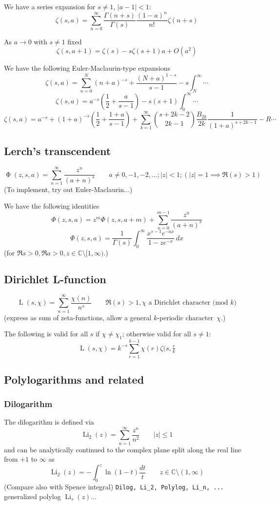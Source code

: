 \documentclass[10pt,dvipdfmx,letterpaper,twoside]{article}
\let\O=\operatorname
\newcommand{\CC}{{\mathbb{C}}}
\let\Gam=\Gamma
\begin{document}
We have a series expansion for $s\neq1$, $|a-1|<1$:
\[ \zeta(s,a) = \sum_{n=0}^\infty \frac{\Gam(n+s)}{\Gam(s)} \frac{(1-a)^n}{n!}\zeta(n+s) \]

As $a\to0$ with $s\neq1$ fixed
\[ \zeta(s,a+1) = \zeta(s) - s \zeta(s+1)a + O(a^2) \]

We have the following Euler-Maclaurin-type expansions
\[ \zeta(s,a) = \sum_{n=0}^N(n+a)^{-s} + \frac{(N+a)^{1-s}}{s-1} - s\int_N^\infty \cdots \]
\[ \zeta(s,a) = a^{-s}(\frac12 + \frac{a}{s-1}) - s(s+1)\int_0^\infty \cdots \]
\[ \zeta(s,a) = a^{-s} + (1+a)^{-s}(\frac12 + \frac{1+a}{s-1}) + \sum_{k=1}^\infty\binom{s+2k-2}{2k-1}\frac{B_{2k}}{2k} \frac{1}{(1+a)^{s+2k-1}} - R\cdots \]

\subsection{Lerch's transcendent}
\[ \O{\Phi}(z,s,a) = \sum_{n=1}^\infty \frac{z^n}{(a+n)^s} \qquad a\neq0,-1,-2,\dots; |z|<1; (|z|=1 \implies \Re(s)>1) \]
(To implement, try out Euler-Maclaurin...)

We have the following identities
\[ \Phi(z,s,a) = z^m \Phi(z,s,a+m) + \sum_{n=0}^{m-1}\frac{z^n}{(a+n)^s} \]
\[ \Phi(z,s,a) = \frac{1}{\Gam(s)}\int_0^\infty \frac{x^{s-1} e^{-ax}}{1-z e^{-x}}\,dx \]
(for $\Re s>0, \Re a>0, z\in\CC\setminus[1,\infty)$.)

\subsection{Dirichlet L-function}
\[ \O{L}(s,\chi) = \sum_{n=1}^\infty \frac{\chi(n)}{n^s} \qquad \Re(s)>1, \text{$\chi$ a Dirichlet character (mod $k$)} \]
(express as sum of zeta-functions, allow a general $k$-periodic character~$\chi$.)

The following is valid for all $s$ if $\chi\neq\chi_1$; otherwise valid for all $s\neq1$:
\[ \O{L}(s,\chi) = k^{-s}\sum_{r=1}^{k-1}\chi(r)\zeta(s,\tfrac{r}{k} \]

\subsection{Polylogarithms and related}

\subsubsection{Dilogarithm}
The dilogarithm is defined via
\[ \O{Li}_2(z) = \sum_{n=1}^\infty \frac{z^n}{n^2} \qquad |z|\leq1 \]
and can be analytically continued to the complex plane split along the real line from $+1$ to $\infty$ as
\[ \O{Li}_2(z) = -\int_0^z \ln(1-t) \frac{dt}{t} \qquad z\in\CC\setminus(1,\infty) \]
(Compare also with Spence integral)
{\tt Dilog, Li\_2, Polylog, Li\_n, ...} generalized polylog $\O{Li}_s(z)$...
\end{document}
